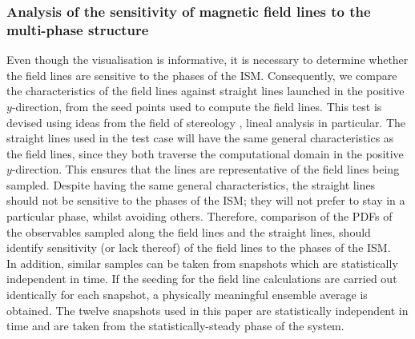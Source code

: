 \documentclass[useAMS,usenatbib]{mn2e}
\begin{document}
\subsubsection{Analysis of the sensitivity of magnetic field lines to the multi-phase structure}
Even though the visualisation is informative, it is necessary to determine whether the field lines are sensitive to the phases of the ISM. Consequently, we compare the characteristics of the field lines against straight lines launched in the positive $y$-direction, from the seed points used to compute the field lines. This test is devised using ideas from the field of stereology \citep{BJ04}, lineal analysis in particular. The straight lines used in the test case will have the same general characteristics as the field lines, since they both traverse the computational domain in the positive $y$-direction. This ensures that the lines are representative of the field lines being sampled. Despite having the same general characteristics, the straight lines should not be sensitive to the phases of the ISM; they will not prefer to stay in a particular phase, whilst avoiding others. Therefore, comparison of the PDFs of the observables sampled along the field lines and the straight lines, should identify sensitivity (or lack thereof) of the field lines to the phases of the ISM.\\
In addition, similar samples can be taken from snapshots which are statistically independent in time. If the seeding for the field line calculations are carried out identically for each snapshot, a physically meaningful ensemble average is obtained. The twelve snapshots used in this paper are statistically independent in time and are taken from the statistically-steady phase of the system.
\end{document}
